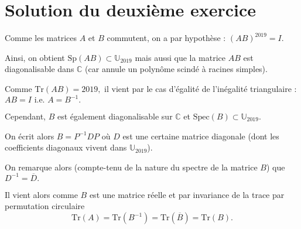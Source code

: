 \section{Solution du deuxième exercice}

Comme les matrices $A$ et $B$ commutent, on a par hypothèse : $\displaystyle (AB)^{2019}=I.$

Ainsi, on obtient $\mbox{Sp}(AB)\subset \mathbb{U}_{2019}$ mais aussi que la matrice $AB$ est diagonalisable dans $\mathbb{C}$ (car annule un polynôme scindé à racines simples).

Comme $\mbox{Tr}(AB)=2019,$ il vient par le cas d'égalité de l'inégalité triangulaire : $AB=I \mbox{ i.e. } A=B^{-1}.$

Cependant, $B$ est également diagonalisable sur $\mathbb{C}$ et $\mbox{Spec}(B)\subset \mathbb{U}_{2019}.$ 

On écrit alors $B=P^{-1}DP$ où $D$ est une certaine matrice diagonale (dont les coefficients diagonaux vivent dans $\mathbb{U}_{2019}$).

On remarque alors (compte-tenu de la nature du spectre de la matrice $B$) que $\displaystyle D^{-1}=\overline{D}.$

Il vient alors comme $B$ est une matrice réelle et par invariance de la trace par permutation circulaire $$\mbox{Tr}(A)=\mbox{Tr}(B^{-1})=\mbox{Tr}(\overline{B})=\mbox{Tr}(B).$$


